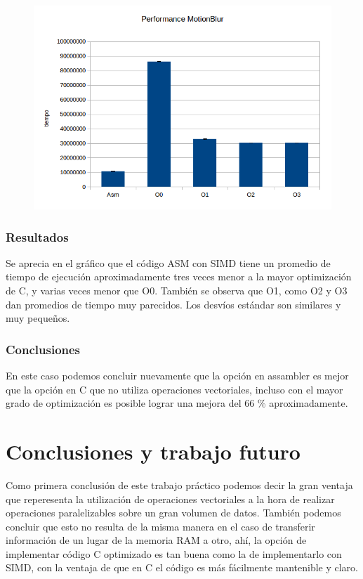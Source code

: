 \documentclass[a4paper]{article}
\begin{document}
\begin{figure}[h!]
  \begin{center}
  \includegraphics[scale=0.66]{Graficos1.4/mbl/per.jpg}
  \label{nombreparareferenciar11}
  \end{center}
\end{figure}

\subsubsection{Resultados}
Se aprecia en el gráfico que el código ASM con SIMD tiene un promedio de tiempo de ejecución aproximadamente tres veces menor a la mayor optimización de C, y varias veces menor que O0. También se observa que O1, como O2 y O3 dan promedios de tiempo muy parecidos. Los desvíos estándar son similares y muy pequeños.

\subsubsection{Conclusiones}

En este caso podemos concluir nuevamente que la opción en assambler es mejor que la opción en C que no utiliza operaciones vectoriales, incluso con el mayor grado de optimización es posible lograr una mejora del 66 \% aproximadamente.

\newpage
\section{Conclusiones y trabajo futuro}

Como primera conclusión de este trabajo práctico podemos decir la gran ventaja que reperesenta la utilización de operaciones vectoriales a la hora de realizar operaciones paralelizables sobre un gran volumen de datos. También podemos concluir que esto no resulta de la misma manera en el caso de transferir información de un lugar de la memoria RAM a otro, ahí, la opción de implementar código C optimizado es tan buena como la de implementarlo con SIMD, con la ventaja de que en C el código es más fácilmente mantenible y claro.
\end{document}
